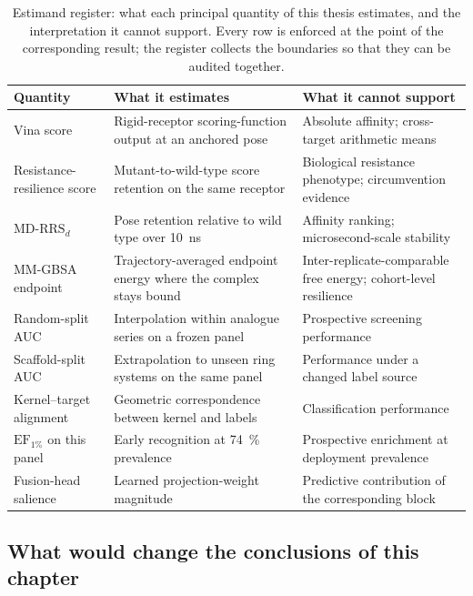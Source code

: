 \begin{table}[htbp]
	\centering
	\caption[Estimand register of the reported quantities]{Estimand register: what each principal quantity of this thesis estimates, and the interpretation it cannot support. Every row is enforced at the point of the corresponding result; the register collects the boundaries so that they can be audited together.}
	\label{tab:res_estimand_register}
	\small
	\begin{tabularx}{\textwidth}{l X X}
		\toprule
		Quantity & What it estimates & What it cannot support \\
		\midrule
		Vina score & Rigid-receptor scoring-function output at an anchored pose & Absolute affinity; cross-target arithmetic means \\
		Resistance-resilience score & Mutant-to-wild-type score retention on the same receptor & Biological resistance phenotype; circumvention evidence \\
		MD-$\mathrm{RRS}_{d}$ & Pose retention relative to wild type over \qty{10}{\ns} & Affinity ranking; microsecond-scale stability \\
		MM-GBSA endpoint & Trajectory-averaged endpoint energy where the complex stays bound & Inter-replicate-comparable free energy; cohort-level resilience \\
		Random-split AUC & Interpolation within analogue series on a frozen panel & Prospective screening performance \\
		Scaffold-split AUC & Extrapolation to unseen ring systems on the same panel & Performance under a changed label source \\
		Kernel--target alignment & Geometric correspondence between kernel and labels & Classification performance \\
		$\mathrm{EF}_{1\%}$ on this panel & Early recognition at \qty{74}{\percent} prevalence & Prospective enrichment at deployment prevalence \\
		Fusion-head salience & Learned projection-weight magnitude & Predictive contribution of the corresponding block \\
		\bottomrule
	\end{tabularx}
\end{table}

\subsection{What would change the conclusions of this chapter}\label{sec:res_falsification}

